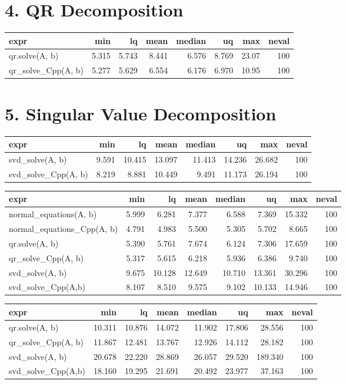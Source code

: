 \documentclass[
]{article}
\begin{document}
\hypertarget{qr-decomposition}{%
\section{4. QR Decomposition}\label{qr-decomposition}}

\begin{longtable}[]{@{}lrrrrrrr@{}}
\toprule
expr & min & lq & mean & median & uq & max & neval\tabularnewline
\midrule
\endhead
qr.solve(A, b) & 5.315 & 5.743 & 8.441 & 6.576 & 8.769 & 23.07 &
100\tabularnewline
qr\_solve\_Cpp(A, b) & 5.277 & 5.629 & 6.554 & 6.176 & 6.970 & 10.95 &
100\tabularnewline
\bottomrule
\end{longtable}

\hypertarget{singular-value-decomposition}{%
\section{5. Singular Value
Decomposition}\label{singular-value-decomposition}}

\begin{longtable}[]{@{}lrrrrrrr@{}}
\toprule
expr & min & lq & mean & median & uq & max & neval\tabularnewline
\midrule
\endhead
svd\_solve(A, b) & 9.591 & 10.415 & 13.097 & 11.413 & 14.236 & 26.682 &
100\tabularnewline
svd\_solve\_Cpp(A, b) & 8.219 & 8.881 & 10.449 & 9.491 & 11.173 & 26.194
& 100\tabularnewline
\bottomrule
\end{longtable}

\begin{longtable}[]{@{}lrrrrrrr@{}}
\toprule
expr & min & lq & mean & median & uq & max & neval\tabularnewline
\midrule
\endhead
normal\_equations(A, b) & 5.999 & 6.281 & 7.377 & 6.588 & 7.369 & 15.332
& 100\tabularnewline
normal\_equations\_Cpp(A, b) & 4.791 & 4.983 & 5.500 & 5.305 & 5.702 &
8.665 & 100\tabularnewline
qr.solve(A, b) & 5.390 & 5.761 & 7.674 & 6.124 & 7.306 & 17.659 &
100\tabularnewline
qr\_solve\_Cpp(A, b) & 5.317 & 5.615 & 6.218 & 5.936 & 6.386 & 9.740 &
100\tabularnewline
svd\_solve(A, b) & 9.675 & 10.128 & 12.649 & 10.710 & 13.361 & 30.296 &
100\tabularnewline
svd\_solve\_Cpp(A,b) & 8.107 & 8.510 & 9.575 & 9.102 & 10.133 & 14.946 &
100\tabularnewline
\bottomrule
\end{longtable}

\begin{longtable}[]{@{}lrrrrrrr@{}}
\toprule
expr & min & lq & mean & median & uq & max & neval\tabularnewline
\midrule
\endhead
qr.solve(A, b) & 10.311 & 10.876 & 14.072 & 11.902 & 17.806 & 28.556 &
100\tabularnewline
qr\_solve\_Cpp(A, b) & 11.867 & 12.481 & 13.767 & 12.926 & 14.112 &
28.182 & 100\tabularnewline
svd\_solve(A, b) & 20.678 & 22.220 & 28.869 & 26.057 & 29.520 & 189.340
& 100\tabularnewline
svd\_solve\_Cpp(A,b) & 18.160 & 19.295 & 21.691 & 20.492 & 23.977 &
37.163 & 100\tabularnewline
\bottomrule
\end{longtable}
\end{document}
